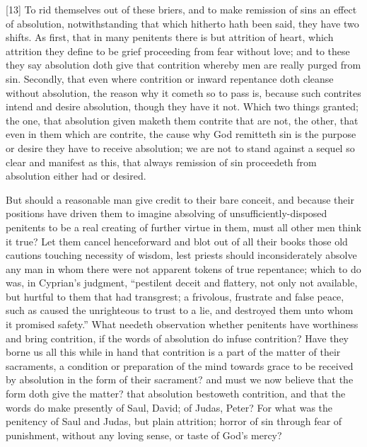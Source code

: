 [13] To rid themselves out of these briers, and to make remission of sins an effect of absolution, notwithstanding that which hitherto hath been said, they have two shifts. As first, that in many penitents there is but attrition of heart, which attrition they define to be grief proceeding from fear without love; and to these they say absolution doth give that contrition  whereby men are really purged from sin. Secondly, that even where contrition or inward repentance doth cleanse without absolution, the reason why it cometh so to pass is, because such contrites intend and desire absolution, though they have it not. Which two things granted; the one, that absolution given maketh them contrite that are not, the other, that even in them which are contrite, the cause why God remitteth sin is the purpose or desire they have to receive absolution; we are not to stand against a sequel so clear and manifest as this, that always remission of sin proceedeth from absolution either had or desired.

But should a reasonable man give credit to their bare conceit, and because their positions have driven them to imagine absolving of unsufficiently-disposed penitents to be a real creating of further virtue in them, must all other men think it true? Let them cancel henceforward and blot out of all their books those old cautions touching necessity of wisdom, lest priests should inconsiderately absolve any man in whom there were not apparent tokens of true repentance; which to do was, in Cyprian’s judgment, “pestilent deceit and flattery, not only not available, but hurtful to them that had transgrest; a frivolous, frustrate and false peace, such as caused the unrighteous to trust to a lie, and destroyed them unto whom it promised safety.” What needeth observation whether penitents have worthiness and bring contrition, if the words of absolution do infuse contrition? Have they borne us all this while in hand that contrition is a part of the  matter of their sacraments, a condition or preparation of the mind towards grace to be received by absolution in the form of their sacrament? and must we now believe that the form doth give the matter? that absolution bestoweth contrition, and that the words do make presently of Saul, David; of Judas, Peter? For what was the penitency of Saul and Judas, but plain attrition; horror of sin through fear of punishment, without any loving sense, or taste of God’s mercy?

